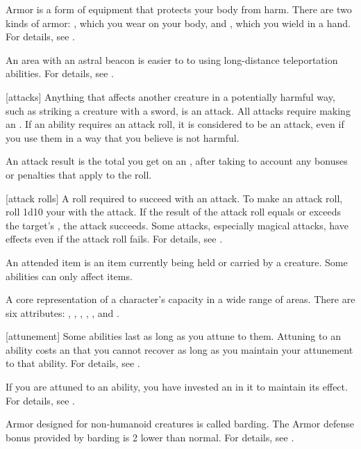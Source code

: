  Armor is a form of equipment that protects your body from harm.
There are two kinds of armor: , which you wear on your body, and , which you wield in a hand.
For details, see .

 An area with an astral beacon is easier to  to using long-distance teleportation abilities.
For details, see .

[attacks] Anything that affects another creature in a potentially harmful way, such as striking a creature with a sword, is an attack.
All attacks require making an .
If an ability requires an attack roll, it is considered to be an attack, even if you use them in a way that you believe is not harmful.

 An attack result is the total you get on an , after taking to account any bonuses or penalties that apply to the roll.

[attack rolls] A roll required to succeed with an attack.
To make an attack roll, roll 1d10 \add your  with the attack.
If the result of the attack roll equals or exceeds the target's , the attack succeeds.
Some attacks, especially magical attacks, have effects even if the attack roll fails.
For details, see .

 An attended item is an item currently being held or carried by a creature.
Some abilities can only affect  items.

 A core representation of a character's capacity in a wide range of areas. There are six attributes: , , , , , and .

[attunement] Some abilities last as long as you attune to them.
Attuning to an ability costs an  that you cannot recover as long as you maintain your attunement to that ability.
For details, see .

 If you are attuned to an ability, you have invested an  in it to maintain its effect.
For details, see .

 Armor designed for non-humanoid creatures is called barding.
The Armor defense bonus provided by barding is 2 lower than normal.
For details, see .

